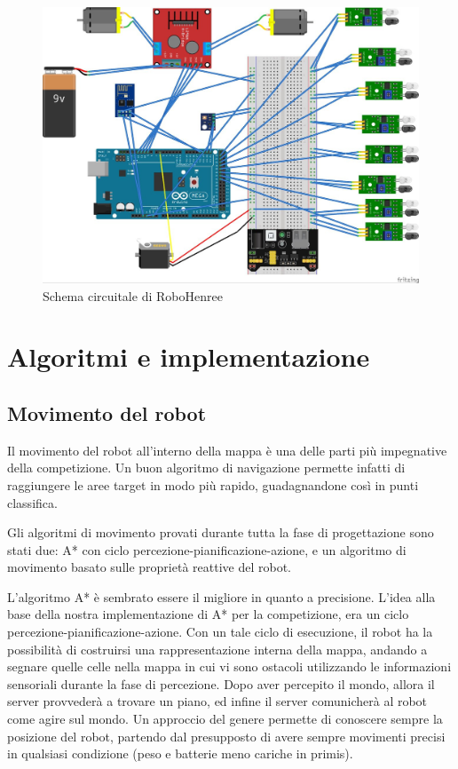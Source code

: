 \documentclass[a4paper,12pt,italian]{article}
\begin{document}
\begin{figure}[H]
	\begin{center}
	\includegraphics[scale=0.15]{circuito}
	\caption{Schema circuitale di RoboHenree}
	\label{Fig: circuito}
	\end{center}
\end{figure}

\section{Algoritmi e implementazione}

\subsection{Movimento del robot}
Il movimento del robot all'interno della mappa è una delle parti più impegnative della competizione. Un buon algoritmo di navigazione permette infatti di raggiungere le aree target in modo più rapido, guadagnandone così in punti classifica.

Gli algoritmi di movimento provati durante tutta la fase di progettazione sono stati due: A* con ciclo percezione-pianificazione-azione, e un algoritmo di movimento basato sulle proprietà reattive del robot.

L'algoritmo A* è sembrato essere il migliore in quanto a precisione. L'idea alla base della nostra implementazione di A* per la competizione, era un ciclo percezione-pianificazione-azione. Con un tale ciclo di esecuzione, il robot ha la possibilità di costruirsi una rappresentazione interna della mappa, andando a segnare quelle celle nella mappa in cui vi sono ostacoli utilizzando le informazioni sensoriali durante la fase di percezione. Dopo aver percepito il mondo, allora il server provvederà a trovare un piano, ed infine il server comunicherà al robot come agire sul mondo. Un approccio del genere permette di conoscere sempre la posizione del robot, partendo dal presupposto di avere sempre movimenti precisi in qualsiasi condizione (peso e batterie meno cariche in primis).
\end{document}

